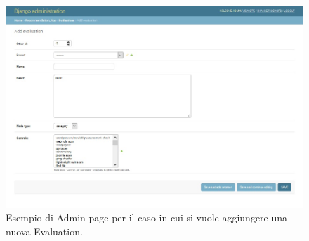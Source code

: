 %
\begin{figure}[ht!]
    \centering
    \includegraphics[scale=0.55]{images/MCRS_adminpage_evaluationEX_add.jpg}
    \caption[Admin page per aggiungere una nuova Evaluation]{Esempio di Admin page per il caso in cui si vuole aggiungere una nuova Evaluation.}
    \label{fig:MCRS_adminpage_evaluationEX_add}
\end{figure}
%
\newpage
%
